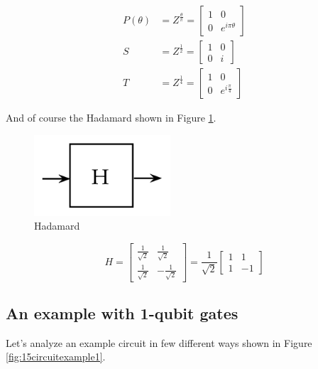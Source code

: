 \documentclass[main.tex]{subfiles}
\begin{document}
    $$
    \begin{aligned}
    P(\theta) &=Z^{\frac{\theta}{\pi}}=\left[\begin{array}{cc}
    1 & 0 \\
    0 & e^{i \pi \theta}
    \end{array}\right] \\
    S &=Z^{\frac{1}{2}}=\left[\begin{array}{ll}
    1 & 0 \\
    0 & i
    \end{array}\right] \\
    T &=Z^{\frac{1}{4}}=\left[\begin{array}{cc}
    1 & 0 \\
    0 & e^{i \frac{\pi}{4}}
    \end{array}\right]
    \end{aligned}
    $$
    
    And of course the Hadamard shown in Figure \ref{fig:14gate5}.
    
    \begin{figure}
        \centering
        \includegraphics[width=2in]{notes/figs/n08/14gate5.png}
        \caption{Hadamard}
        \label{fig:14gate5}
    \end{figure}
    
    $$
    H=\left[\begin{array}{cc}
    \frac{1}{\sqrt{2}} & \frac{1}{\sqrt{2}} \\
    \frac{1}{\sqrt{2}} & -\frac{1}{\sqrt{2}}
    \end{array}\right]=\frac{1}{\sqrt{2}}\left[\begin{array}{cc}
    1 & 1 \\
    1 & -1
    \end{array}\right]
    $$

\subsection{An example with 1-qubit gates}

    Let's analyze an example circuit in few different ways shown in Figure \ref{fig:15circuitexample1}.
    
\end{document}

